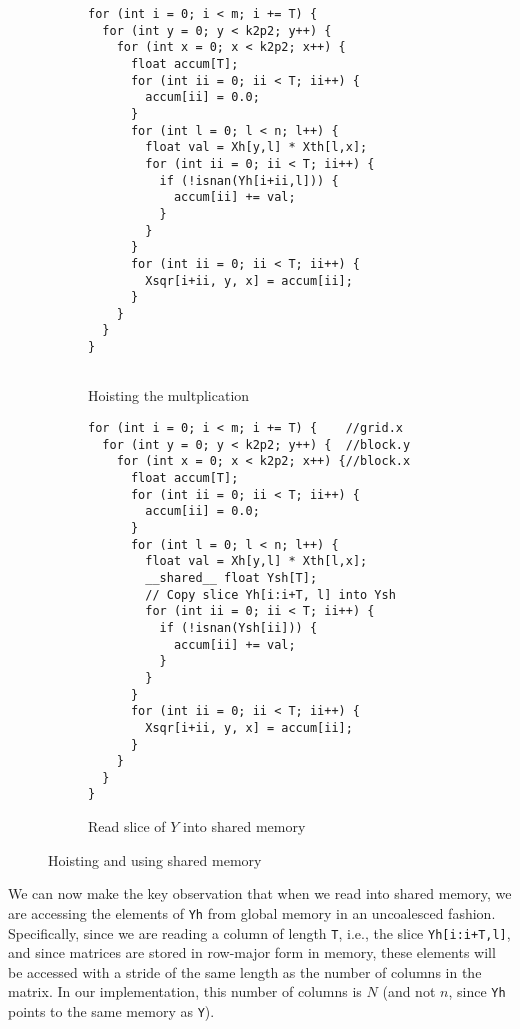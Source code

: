 \begin{figure}[H]
\centering
\begin{subfigure}{.55\textwidth}
  \centering
  \begin{verbatim}
for (int i = 0; i < m; i += T) {
  for (int y = 0; y < k2p2; y++) {
    for (int x = 0; x < k2p2; x++) {
      float accum[T];
      for (int ii = 0; ii < T; ii++) {
        accum[ii] = 0.0;
      }
      for (int l = 0; l < n; l++) {
        float val = Xh[y,l] * Xth[l,x];
        for (int ii = 0; ii < T; ii++) {
          if (!isnan(Yh[i+ii,l])) {
            accum[ii] += val;
          }
        }
      }
      for (int ii = 0; ii < T; ii++) {
        Xsqr[i+ii, y, x] = accum[ii];
      }
    }
  }
}


\end{verbatim}
  \caption{Hoisting the multplication}
  \label{fig:2-hoist}
\end{subfigure}%
\begin{subfigure}{.5\textwidth}
  \centering
\begin{verbatim}
for (int i = 0; i < m; i += T) {    //grid.x
  for (int y = 0; y < k2p2; y++) {  //block.y
    for (int x = 0; x < k2p2; x++) {//block.x
      float accum[T];
      for (int ii = 0; ii < T; ii++) {
        accum[ii] = 0.0;
      }
      for (int l = 0; l < n; l++) {
        float val = Xh[y,l] * Xth[l,x];
        __shared__ float Ysh[T];
        // Copy slice Yh[i:i+T, l] into Ysh
        for (int ii = 0; ii < T; ii++) {
          if (!isnan(Ysh[ii])) {
            accum[ii] += val;
          }
        }
      }
      for (int ii = 0; ii < T; ii++) {
        Xsqr[i+ii, y, x] = accum[ii];
      }
    }
  }
}
\end{verbatim}
\caption{Read slice of \(Y\) into shared memory}
  \label{fig:2-shared}
\end{subfigure}
\caption{Hoisting and using shared memory}
\label{fig:2-opt-3-badname}
\end{figure}

We can now make the key observation that when we read into shared memory, we
are accessing the elements of \texttt{Yh} from global memory in an uncoalesced
fashion.
Specifically, since we are reading a column of length \texttt{T}, i.e., the
slice \texttt{Yh[i:i+T,l]}, and since matrices are stored in row-major form in
memory, these elements will be accessed with a stride of the same length as the
number of columns in the matrix.
In our implementation, this number of columns is \(N\) (and not \(n\), since
\texttt{Yh} points to the same memory as \texttt{Y}).

